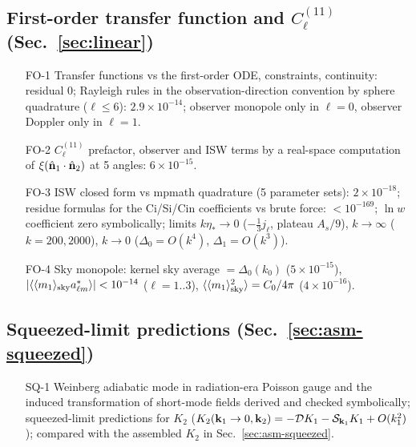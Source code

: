 \subsection*{First-order transfer function and \texorpdfstring{$C^{(11)}_\ell$}{C11} (Sec.~\ref{sec:linear})}
\begin{itemize}\itemsep1pt
\item[FO-1] Transfer functions vs the first-order ODE, constraints, continuity: residual 0; Rayleigh rules in the observation-direction convention by sphere quadrature ($\ell\le6$): $2.9\times10^{-14}$; observer monopole only in $\ell=0$, observer Doppler only in $\ell=1$.
\item[FO-2] $C^{(11)}_\ell$ prefactor, observer and ISW terms by a real-space computation of $\xi(\hat{\mathbf n}_1\cdot\hat{\mathbf n}_2)$ at 5 angles: $6\times10^{-15}$.
\item[FO-3] ISW closed form vs mpmath quadrature (5 parameter sets): $2\times10^{-18}$; residue formulas for the Ci/Si/Cin coefficients vs brute force: $<10^{-169}$; $\ln w$ coefficient zero symbolically; limits $k\eta_*\to0$ ($-\tfrac13j_\ell$, plateau $A_s/9$), $k\to\infty$ ($k=200,2000$), $k\to0$ ($\Delta_0=O(k^4)$, $\Delta_1=O(k^3)$).
\item[FO-4] Sky monopole: kernel sky average $=\Delta_0(k_0)$ ($5\times10^{-15}$), $|\langle\langle m_1\rangle_{\rm sky}a^*_{\ell m}\rangle|<10^{-14}$ ($\ell=1..3$), $\langle\langle m_1\rangle_{\rm sky}^2\rangle=C_0/4\pi$ ($4\times10^{-16}$).
\end{itemize}

\subsection*{Squeezed-limit predictions (Sec.~\ref{sec:asm-squeezed})}
\begin{itemize}\itemsep1pt
\item[SQ-1] Weinberg adiabatic mode in radiation-era Poisson gauge and the induced transformation of short-mode fields derived and checked symbolically; squeezed-limit predictions for $K_2$ ($K_2(\mathbf k_1\to0,\mathbf k_2)=-\mathcal D K_1-\mathcal S_{\mathbf k_1}K_1+O(k_1^2)$); compared with the assembled $K_2$ in Sec.~\ref{sec:asm-squeezed}.
\end{itemize}

